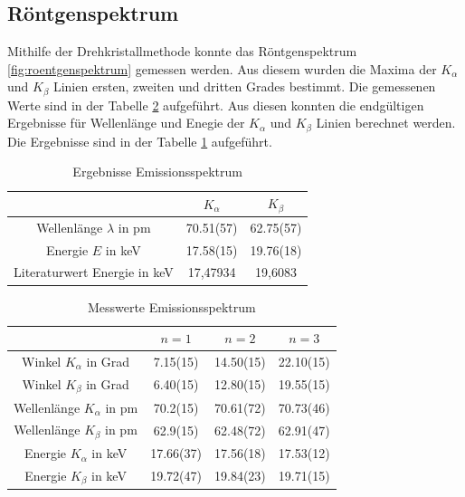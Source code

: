 \documentclass[11pt, a4paper]{article}
\begin{document}
    \subsection{Röntgenspektrum}

    Mithilfe der Drehkristallmethode konnte das Röntgenspektrum \ref{fig:roentgenspektrum} gemessen werden. Aus diesem wurden die Maxima der $K_{\alpha}$ und $K_{\beta}$ Linien ersten, zweiten und dritten Grades bestimmt. Die gemessenen Werte sind in der Tabelle \ref{tab:roentgenspektrum} aufgeführt. Aus diesen konnten die endgültigen Ergebnisse für Wellenlänge und Enegie der $K_{\alpha}$ und $K_{\beta}$ Linien berechnet werden. Die Ergebnisse sind in der Tabelle \ref{tab:linienerg} aufgeführt.

    \begin{table}
        \centering
        \caption{Ergebnisse Emissionsspektrum}
        \label{tab:linienerg}
        \begin{tabular}{c|c|c}
            & $K_{\alpha}$ & $K_{\beta}$ \\
            \hline
            Wellenlänge $\lambda$ in pm & 70.51(57) & 62.75(57) \\
            Energie $E$ in keV & 17.58(15) & 19.76(18) \\
            Literaturwert Energie \cite{lin} in keV & 17,47934 & 19,6083
        \end{tabular}
    \end{table}

    \begin{table}[h]
        \centering
        \label{tab:roentgenspektrum}
        \begin{tabular}{c|c|c|c}
        & \textbf{$n = 1$} & \textbf{$n = 2$} & \textbf{$n = 3$} \\ 
        \hline
        Winkel $K_{\alpha}$ in Grad & 7.15(15) & 14.50(15) & 22.10(15)\\ 
        Winkel $K_{\beta}$ in Grad & 6.40(15) & 12.80(15) & 19.55(15)\\ 
        Wellenlänge $K_{\alpha}$ in pm & 70.2(15) & 70.61(72) & 70.73(46) \\ 
        Wellenlänge $K_{\beta}$ in pm & 62.9(15) & 62.48(72) & 62.91(47)\\ 
        Energie $K_{\alpha}$ in keV & 17.66(37) & 17.56(18) & 17.53(12)\\ 
        Energie $K_{\beta}$ in keV & 19.72(47) & 19.84(23) & 19.71(15)\\ 
        \end{tabular}
        \caption{Messwerte Emissionsspektrum}
    \end{table}
\end{document}
